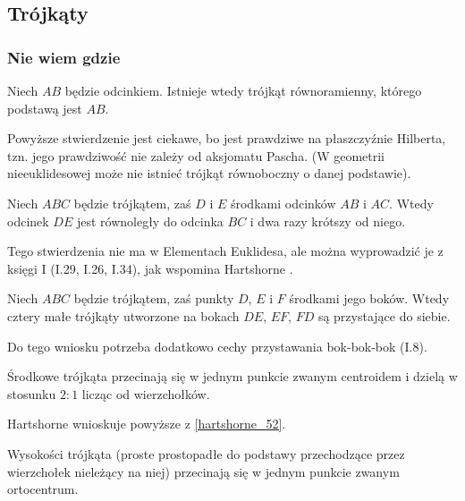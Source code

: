 \subsection{Trójkąty}
\subsubsection{Nie wiem gdzie}

\begin{proposition}
	\label{hartshorne_52}
    Niech $AB$ będzie odcinkiem.
	Istnieje wtedy trójkąt równoramienny, którego podstawą jest $AB$.
\end{proposition}

Powyższe stwierdzenie jest ciekawe, bo jest prawdziwe na płaszczyźnie Hilberta, tzn. jego prawdziwość nie zależy od aksjomatu Pascha.
(W geometrii nieeuklidesowej może nie istnieć trójkąt równoboczny o danej podstawie).


\begin{proposition}
	\label{hartshorne_52}
    Niech $ABC$ będzie trójkątem, zaś $D$ i $E$ środkami odcinków $AB$ i $AC$.
	Wtedy odcinek $DE$ jest równoległy do odcinka $BC$ i dwa razy krótszy od niego.
\end{proposition}

Tego stwierdzenia nie ma w Elementach Euklidesa, ale można wyprowadzić je z księgi I (I.29, I.26, I.34), jak wspomina Hartshorne \cite[s. 52. 53]{hartshorne2000}.

\begin{corollary}
	Niech $ABC$ będzie trójkątem, zaś punkty $D$, $E$ i $F$ środkami jego boków.
	Wtedy cztery małe trójkąty utworzone na bokach $DE$, $EF$, $FD$ są przystające do siebie.
\end{corollary}

Do tego wniosku potrzeba dodatkowo cechy przystawania bok-bok-bok (I.8).

\begin{proposition}
	\label{srodkowe_przecinaja_sie}
	Środkowe trójkąta przecinają się w jednym punkcie zwanym centroidem i dzielą w stosunku $2 : 1$ licząc od wierzchołków.
\end{proposition}

Hartshorne \cite[s. 53, 54]{hartshorne2000} wnioskuje powyższe z \ref{hartshorne_52}.

\begin{proposition}
	\label{wysokosci_przecinaja_sie}
	Wysokości trójkąta (proste prostopadłe do podstawy przechodzące przez wierzchołek nieleżący na niej) przecinają się w jednym punkcie zwanym ortocentrum.
\end{proposition}

